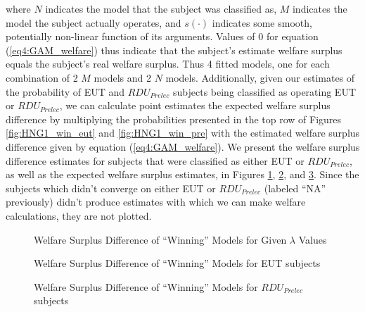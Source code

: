 \documentclass[../main.tex]{subfiles}
\begin{document}
\noindent where $N$ indicates the model that the subject was classified as, $M$ indicates the model the subject actually operates, and $s(\cdot)$ indicates some smooth, potentially non-linear function of its arguments.
Values of 0 for equation (\ref{eq4:GAM_welfare}) thus indicate that the subject's estimate welfare surplus equals the subject's real welfare surplus.
Thus 4 fitted models, one for each combination of 2 $M$ models and 2 $N$ models.
Additionally, given our estimates of the probability of EUT and $\mathit{RDU_{Prelec}}$ subjects being classified as operating EUT or $\mathit{RDU_{Prelec}}$, we can calculate point estimates the expected welfare surplus difference by multiplying the probabilities presented in the top row of Figures \ref{fig:HNG1_win_eut} and \ref{fig:HNG1_win_pre} with the estimated welfare surplus difference given by equation (\ref{eq4:GAM_welfare}).
We present the welfare surplus difference estimates for subjects that were classified as either EUT or $\mathit{RDU_{Prelec}}$, as well as the expected welfare surplus estimates, in Figures \ref{fig:HNG1_wel_mu}, \ref{fig:HNG1_wel_eut}, and \ref{fig:HNG1_wel_pre}.
Since the subjects which didn't converge on either EUT or $\mathit{RDU_{Prelec}}$ (labeled \enquote{NA} previously) didn't produce estimates with which we can make welfare calculations, they are not plotted.

\begin{figure}[htp!]
	\center
	\caption{Welfare Surplus Difference of \enquote{Winning} Models for Given $\lambda$ Values}
	\label{fig:HNG1_wel_mu}
\end{figure}

\begin{figure}[hbp!]
	\center
	\caption{Welfare Surplus Difference of \enquote{Winning} Models for EUT subjects}
	\label{fig:HNG1_wel_eut}
\end{figure}

\begin{figure}[ht!]
	\center
	\caption{Welfare Surplus Difference of \enquote{Winning} Models for $\mathit{RDU_{Prelec}}$ subjects}
	\label{fig:HNG1_wel_pre}
\end{figure}
\end{document}
